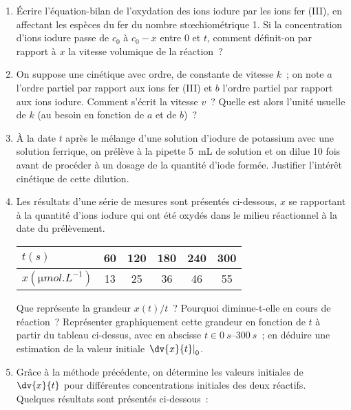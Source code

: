 \documentclass[a4paper, 12pt, final, garamond]{book}
\begin{document}
\begin{enumerate}
    \item Écrire l'équation-bilan de l'oxydation des ions iodure par les ions
        fer (III), en affectant les espèces du fer du nombre stœchiométrique 1.
        Si la concentration d'ions iodure passe de $c_0$ à $c_0 - x$ entre 0 et
        $t$, comment définit-on par rapport à $x$ la vitesse volumique de la
        réaction~?
    \item On suppose une cinétique avec ordre, de constante de vitesse $k$~; on
        note $a$ l'ordre partiel par rapport aux ions fer (III) et $b$ l'ordre
        partiel par rapport aux ions iodure. Comment s'écrit la vitesse $v$~?
        Quelle est alors l'unité usuelle de $k$ (au besoin en fonction de $a$ et
        de $b$)~?
    \item À la date $t$ après le mélange d'une solution d'iodure de potassium
        avec une solution ferrique, on prélève à la pipette \SI{5}{mL} de
        solution et on dilue 10 fois avant de procéder à un dosage de la
        quantité d'iode formée. Justifier l'intérêt cinétique de cette dilution.
    \item Les résultats d'une série de mesures sont présentés ci-dessous, $x$ se
        rapportant à la quantité d'ions iodure qui ont été oxydés dans le milieu
        réactionnel à la date du prélèvement.
        \begin{center}
            \begin{tabular}{lccccc}
                \toprule 
                $t(\si{s})$ &
                60 & 120 & 180 & 240 & 300\\
                \midrule
                $x(\si{\micro mol.L^{-1}})$ &
                13 & 25 & 36 & 46 & 55\\
                \bottomrule
            \end{tabular}
        \end{center}
        Que représente la grandeur $x(t)/t$~? Pourquoi diminue-t-elle en cours
        de réaction~? Représenter graphiquement cette grandeur en fonction de
        $t$ à partir du tableau ci-dessus, avec en abscisse $t \in
        \SIrange{0}{300}{s}$~; en déduire une estimation de la valeur initiale
        $\left.\dv{x}{t}\right|_0$.
    \item Grâce à la méthode précédente, on détermine les valeurs initiales de
        $\dv{x}{t}$ pour différentes concentrations initiales des deux réactifs.
        Quelques résultats sont présentés ci-dessous~:
        \begin{center}

\end{center}
\end{enumerate}
\end{document}
